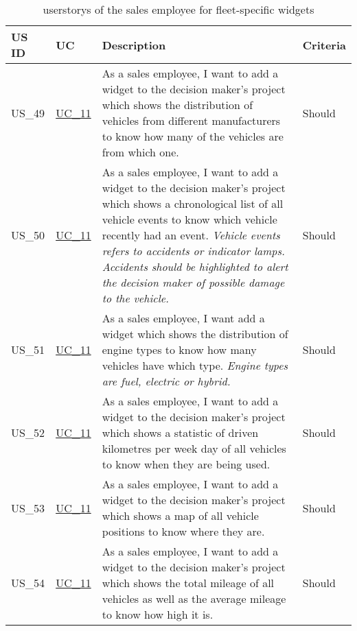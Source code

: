   \sffamily
  \begin{footnotesize}
    \begin{longtable}[L L L L ]{ p{} p{} p{} p{}}
      \caption                       %
          {\Glspl{userstory} of the sales employee for fleet-specific \glspl{widget}} %
          \label{FlottenWidgets}
          \\
      \toprule
      \textbf{US ID} & \textbf{UC} & \textbf{Description} & \textbf{Criteria} \\
      \midrule
      \hypertarget{Ref:US49}{US\_49} & \hyperlink{Ref:UC11}{UC\_11} & As a sales employee, I want to add a \gls{widget} to the decision maker's project which shows the distribution of vehicles from different manufacturers to know how many of the vehicles are from which one. & Should  \\
      
      \rowcolor{Gray}
      \hypertarget{Ref:US50}{US\_50} & \hyperlink{Ref:UC11}{UC\_11} & As a sales employee, I want to add a \gls{widget} to the decision maker's project which shows a chronological list of all vehicle events to know which vehicle recently had an event.
      \newline
      \emph{Vehicle events refers to accidents or indicator lamps. Accidents should be highlighted to alert the decision maker of possible damage to the vehicle.} & Should \\
      
      \hypertarget{Ref:US51}{US\_51} & \hyperlink{Ref:UC11}{UC\_11} & As a sales employee, I want add a \gls{widget} which shows the distribution of engine types to know how many vehicles have which type. 
      \newline
      \emph{Engine types are fuel, electric or hybrid.} & Should \\
      
      \rowcolor{Gray}
      \hypertarget{Ref:US52}{US\_52} & \hyperlink{Ref:UC11}{UC\_11} & As a sales employee, I want to add a \gls{widget} to the decision maker's project which shows a statistic of driven kilometres per week day of all vehicles to know when they are being used. & Should \\
      
      \hypertarget{Ref:US53}{US\_53} & \hyperlink{Ref:UC11}{UC\_11} & As a sales employee, I want to add a \gls{widget} to the decision maker's project which shows a map of all vehicle positions to know where they are. & Should \\
      
      \rowcolor{Gray}
      \hypertarget{Ref:US54}{US\_54} & \hyperlink{Ref:UC11}{UC\_11} & As a sales employee, I want to add a \gls{widget} to the decision maker's project which shows the total mileage of all vehicles as well as the average mileage to know how high it is. & Should \\
      \bottomrule
    \end{longtable}
  \end{footnotesize}
  \rmfamily

